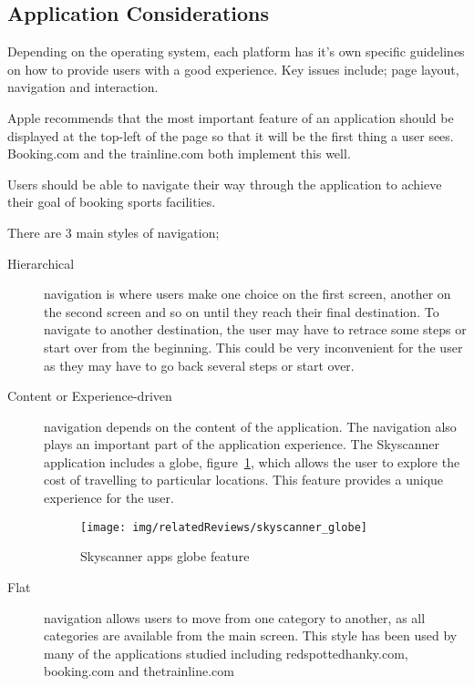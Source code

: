 \subsection{Application Considerations}
\label{sub:application_considerations}

Depending on the operating system, each platform has it's own specific
guidelines on how to provide users with a good experience. Key issues include;
page layout, navigation and interaction.

Apple recommends that the most important feature of an application should be
displayed at the top-left of the page so that it will be the first thing a user
sees\cite{HIGApple2013}.  Booking.com and the trainline.com both implement this
well\cite{BookingcomIOS}.

Users should be able to navigate their way through the application to achieve
their goal of booking sports facilities.

There are 3 main styles of navigation;
\begin{description}
	\item[Hierarchical] navigation is where users make one choice on the first
		screen, another on the second screen and so on until they reach their
		final destination. To navigate to another destination, the user may
		have to retrace some steps or start over from the beginning. This could
		be very inconvenient for the user as they may have to go back several
		steps or start over.
	\item[Content or Experience-driven] navigation depends on the content of
		the application. The navigation also plays an important part of the
		application experience. The Skyscanner application includes a globe,
		figure~\ref{fig:skyscanner_globe}, which allows the user to explore the
		cost of travelling to particular locations. This feature provides a
		unique experience for the user.
		\begin{figure}[htbp]
			\begin{center}
				\texttt{[image: img/relatedReviews/skyscanner\_globe]}
			\end{center}
			\caption{Skyscanner apps globe feature}\label{fig:skyscanner_globe}
		\end{figure}

	\item[Flat] navigation allows users to move from one category to another,
		as all categories are available from the main screen. This style has
		been used by many of the applications studied including
		redspottedhanky.com, booking.com and thetrainline.com
\end{description}

